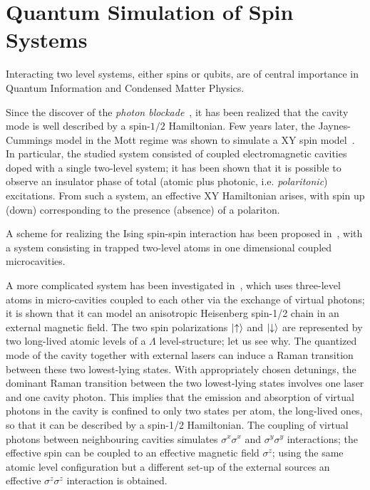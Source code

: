 \section{Quantum Simulation of Spin Systems}
Interacting two level systems, either spins or qubits, are of central importance in Quantum Information and Condensed Matter Physics. 

Since the discover of the \emph{photon blockade}~\cite{ph_blockade}, it has been realized that the cavity mode is well described by a spin-$1/2$ Hamiltonian. Few years later, the Jaynes-Cummings model in the Mott regime was shown to simulate a XY spin model~\cite{angelakis}. In particular, the studied system consisted of coupled electromagnetic cavities doped with a single two-level system; it has been shown that it is possible to observe an insulator phase of total (atomic plus photonic, i.e. \emph{polaritonic}) excitations. From such a system, an effective XY Hamiltonian arises, with spin up (down) corresponding to the presence (absence) of a polariton.

A scheme for realizing the Ising spin-spin interaction has been proposed in~\cite{LiGuGong}, with a system consisting in trapped two-level atoms in one dimensional coupled microcavities. 

A more complicated system has been investigated in~\cite{Hartmann_XYZ}, which uses three-level atoms in micro-cavities coupled to each other via the exchange of virtual photons; it is shown that it can model an anisotropic Heisenberg spin-1/2 chain in an external magnetic field. The two spin polarizations $\ket{\uparrow}$ and $\ket{\downarrow}$ are represented by two long-lived atomic levels of a $\Lambda$ level-structure; let us see why. The quantized mode of the cavity together with external lasers can induce a Raman transition between these two lowest-lying states.  With appropriately chosen detunings, the dominant Raman transition between the two lowest-lying states involves one laser and one cavity photon. This implies that the emission and absorption of virtual photons in the cavity is confined to only two states per atom, the long-lived ones, so that it can be described by a spin-1/2 Hamiltonian. The coupling of virtual photons between neighbouring cavities simulates $\sigma^x\sigma^x$ and $\sigma^y\sigma^y$ interactions; the effective spin can be coupled to an effective magnetic field $\sigma^z$; using the same atomic level configuration but a different set-up of the external sources an effective $\sigma^z\sigma^z$ interaction is obtained.

